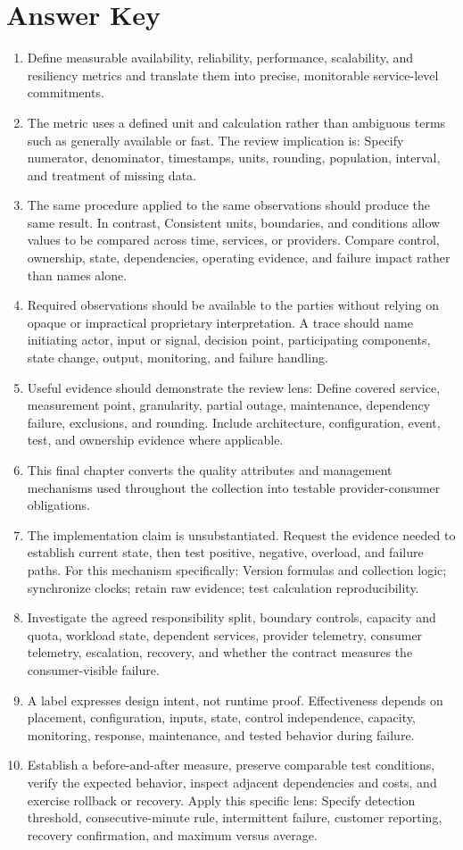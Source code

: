 \documentclass[11pt]{article}
\begin{document}
\section{Answer Key}
\begin{enumerate}
\item Define measurable availability, reliability, performance, scalability, and resiliency metrics and translate them into precise, monitorable service-level commitments.
\item The metric uses a defined unit and calculation rather than ambiguous terms such as generally available or fast. The review implication is: Specify numerator, denominator, timestamps, units, rounding, population, interval, and treatment of missing data.
\item The same procedure applied to the same observations should produce the same result. In contrast, Consistent units, boundaries, and conditions allow values to be compared across time, services, or providers. Compare control, ownership, state, dependencies, operating evidence, and failure impact rather than names alone.
\item Required observations should be available to the parties without relying on opaque or impractical proprietary interpretation. A trace should name initiating actor, input or signal, decision point, participating components, state change, output, monitoring, and failure handling.
\item Useful evidence should demonstrate the review lens: Define covered service, measurement point, granularity, partial outage, maintenance, dependency failure, exclusions, and rounding. Include architecture, configuration, event, test, and ownership evidence where applicable.
\item This final chapter converts the quality attributes and management mechanisms used throughout the collection into testable provider-consumer obligations.
\item The implementation claim is unsubstantiated. Request the evidence needed to establish current state, then test positive, negative, overload, and failure paths. For this mechanism specifically: Version formulas and collection logic; synchronize clocks; retain raw evidence; test calculation reproducibility.
\item Investigate the agreed responsibility split, boundary controls, capacity and quota, workload state, dependent services, provider telemetry, consumer telemetry, escalation, recovery, and whether the contract measures the consumer-visible failure.
\item A label expresses design intent, not runtime proof. Effectiveness depends on placement, configuration, inputs, state, control independence, capacity, monitoring, response, maintenance, and tested behavior during failure.
\item Establish a before-and-after measure, preserve comparable test conditions, verify the expected behavior, inspect adjacent dependencies and costs, and exercise rollback or recovery. Apply this specific lens: Specify detection threshold, consecutive-minute rule, intermittent failure, customer reporting, recovery confirmation, and maximum versus average.
\end{enumerate}
\end{document}
